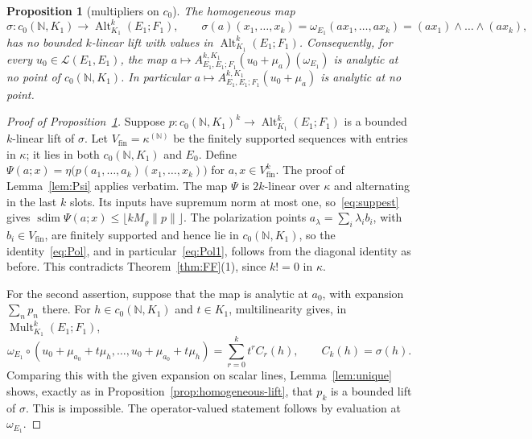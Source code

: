 \documentclass[11pt]{amsart}
\newtheorem{proposition}[theorem]{Proposition}
\theoremstyle{definition}
\theoremstyle{remark}
\numberwithin{equation}{section}
\newcommand{\N}{\mathbb N}
\newcommand{\cL}{\mathcal L}
\newcommand{\Alt}{\operatorname{Alt}}
\newcommand{\Mult}{\operatorname{Mult}}
\newcommand{\norm}[1]{\lVert #1\rVert}
\newcommand{\sdim}{\operatorname{sdim}}
\theoremstyle{plain}
\theoremstyle{definition}
\theoremstyle{plain}
\begin{document}
\begin{proposition}[multipliers on $c_0$]\label{lau:prop:c0-multipliers}
The homogeneous map
\[
 \sigma\colon c_0(\N,K_1)\to\Alt^k_{K_1}(E_1;F_1),\qquad
 \sigma(a)(x_1,\dots,x_k)=\omega_{E_1}(ax_1,\dots,ax_k)=(ax_1)\wedge\dots\wedge(ax_k),
\]
has no bounded $k$\nobreakdash-linear lift with values in $\Alt^k_{K_1}(E_1;F_1)$. Consequently, for every
$u_0\in\cL(E_1,E_1)$, the map $a\mapsto A^{k,K_1}_{E_1,E_1;F_1}(u_0+\mu_a)(\omega_{E_1})$ is analytic at no point of $c_0(\N,K_1)$. In
particular $a\mapsto A^{k,K_1}_{E_1,E_1;F_1}(u_0+\mu_a)$ is analytic at no point.
\end{proposition}



\begin{proof}[Proof of Proposition~\ref{lau:prop:c0-multipliers}]
Suppose $p\colon c_0(\N,K_1)^k\to\Alt^k_{K_1}(E_1;F_1)$ is a bounded $k$\nobreakdash-linear lift of $\sigma$. Let
$V_{\mathrm{fin}}=\kappa^{(\N)}$ be the finitely supported sequences with entries in $\kappa$; it lies in both $c_0(\N,K_1)$
and $E_0$. Define $\Psi(a;x)=\eta\bigl(p(a_1,\dots,a_k)(x_1,\dots,x_k)\bigr)$ for $a,x\in V_{\mathrm{fin}}^k$. The proof of
Lemma~\ref{lem:Psi} applies verbatim. The map $\Psi$ is $2k$\nobreakdash-linear over $\kappa$ and alternating in the last
$k$ slots. Its inputs have supremum norm at most one, so~\eqref{eq:suppest} gives
$\sdim\Psi(a;x)\le\lfloor kM_\varrho\norm p\rfloor$. The polarization points $a_\lambda=\sum_i\lambda_ib_i$, with
$b_i\in V_{\mathrm{fin}}$, are finitely supported and hence lie in $c_0(\N,K_1)$, so the identity~\eqref{eq:Pol}, and in
particular~\eqref{eq:Pol1}, follows from the diagonal identity as before. This contradicts Theorem~\ref{thm:FF}(1), since
$k!=0$ in $\kappa$.

For the second assertion, suppose that the map is analytic at $a_0$, with expansion $\sum_n p_n$ there. For
$h\in c_0(\N,K_1)$ and $t\in K_1$, multilinearity gives, in $\Mult^k_{K_1}(E_1;F_1)$,
\[
 \omega_{E_1}\circ(u_0+\mu_{a_0}+t\mu_h,\dots,u_0+\mu_{a_0}+t\mu_h)=\sum_{r=0}^kt^rC_r(h),\qquad C_k(h)=\sigma(h).
\]
Comparing this with the given expansion on scalar lines, Lemma~\ref{lem:unique} shows, exactly as in
Proposition~\ref{prop:homogeneous-lift}, that $p_k$ is a bounded lift of $\sigma$. This is impossible. The operator-valued
statement follows by evaluation at $\omega_{E_1}$.
\end{proof}
\end{document}

